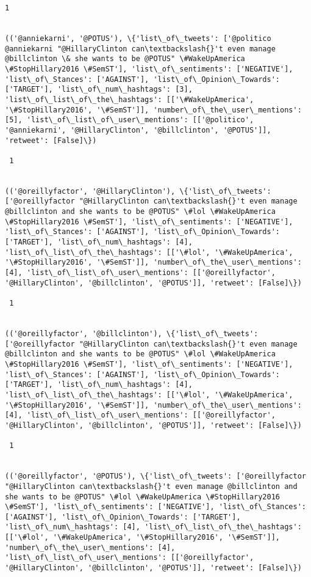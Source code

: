 \documentclass[11pt]{article}
\begin{document}
\begin{Verbatim}[commandchars=\\\{\}]
 1
 

(('@anniekarni', '@POTUS'), \{'list\_of\_tweets': ['@politico @anniekarni "@HillaryClinton can\textbackslash{}'t even manage @billclinton \& she wants to be @POTUS" \#WakeUpAmerica \#StopHillary2016 \#SemST'], 'list\_of\_sentiments': ['NEGATIVE'], 'list\_of\_Stances': ['AGAINST'], 'list\_of\_Opinion\_Towards': ['TARGET'], 'list\_of\_num\_hashtags': [3], 'list\_of\_list\_of\_the\_hashtags': [['\#WakeUpAmerica', '\#StopHillary2016', '\#SemST']], 'number\_of\_the\_user\_mentions': [5], 'list\_of\_list\_of\_user\_mentions': [['@politico', '@anniekarni', '@HillaryClinton', '@billclinton', '@POTUS']], 'retweet': [False]\})

 1
 

(('@oreillyfactor', '@HillaryClinton'), \{'list\_of\_tweets': ['@oreillyfactor "@HillaryClinton can\textbackslash{}'t even manage @billclinton and she wants to be @POTUS" \#lol \#WakeUpAmerica \#StopHillary2016 \#SemST'], 'list\_of\_sentiments': ['NEGATIVE'], 'list\_of\_Stances': ['AGAINST'], 'list\_of\_Opinion\_Towards': ['TARGET'], 'list\_of\_num\_hashtags': [4], 'list\_of\_list\_of\_the\_hashtags': [['\#lol', '\#WakeUpAmerica', '\#StopHillary2016', '\#SemST']], 'number\_of\_the\_user\_mentions': [4], 'list\_of\_list\_of\_user\_mentions': [['@oreillyfactor', '@HillaryClinton', '@billclinton', '@POTUS']], 'retweet': [False]\})

 1
 

(('@oreillyfactor', '@billclinton'), \{'list\_of\_tweets': ['@oreillyfactor "@HillaryClinton can\textbackslash{}'t even manage @billclinton and she wants to be @POTUS" \#lol \#WakeUpAmerica \#StopHillary2016 \#SemST'], 'list\_of\_sentiments': ['NEGATIVE'], 'list\_of\_Stances': ['AGAINST'], 'list\_of\_Opinion\_Towards': ['TARGET'], 'list\_of\_num\_hashtags': [4], 'list\_of\_list\_of\_the\_hashtags': [['\#lol', '\#WakeUpAmerica', '\#StopHillary2016', '\#SemST']], 'number\_of\_the\_user\_mentions': [4], 'list\_of\_list\_of\_user\_mentions': [['@oreillyfactor', '@HillaryClinton', '@billclinton', '@POTUS']], 'retweet': [False]\})

 1
 

(('@oreillyfactor', '@POTUS'), \{'list\_of\_tweets': ['@oreillyfactor "@HillaryClinton can\textbackslash{}'t even manage @billclinton and she wants to be @POTUS" \#lol \#WakeUpAmerica \#StopHillary2016 \#SemST'], 'list\_of\_sentiments': ['NEGATIVE'], 'list\_of\_Stances': ['AGAINST'], 'list\_of\_Opinion\_Towards': ['TARGET'], 'list\_of\_num\_hashtags': [4], 'list\_of\_list\_of\_the\_hashtags': [['\#lol', '\#WakeUpAmerica', '\#StopHillary2016', '\#SemST']], 'number\_of\_the\_user\_mentions': [4], 'list\_of\_list\_of\_user\_mentions': [['@oreillyfactor', '@HillaryClinton', '@billclinton', '@POTUS']], 'retweet': [False]\})


\end{Verbatim}
\end{document}
